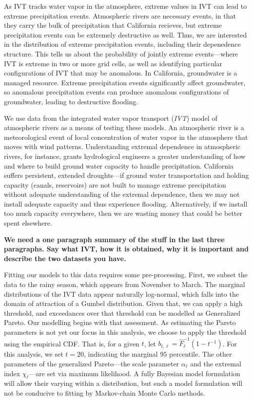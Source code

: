 As IVT tracks water vapor in the atmosphere, extreme values in IVT can lead to
  extreme precipitation events.  Atmospheric rivers are necessary events, in that they carry the
  bulk of precipitation that California recieves, but extreme precipitation events can be extremely
  destructive as well.  Thus, we are interested in the distribution of extreme precipitation events,
  including their depenedence structure.  This tells us about the probability of jointly extreme
  events---where IVT is extreme in two or more grid cells, as well as identifying particular
  configurations of IVT that may be anomalous.  In California, groundwater is a managed resource.
  Extreme precipitation events significantly affect groundwater, so anomalous precipitation events
  can produce anomalous configurations of groundwater, leading to destructive flooding.

We use data from the integrated water vapor transport (\emph{IVT}) model \citep{guan2015}
  of atmospheric rivers as a means of testing these models.  An atmospheric river is a meteorological
  event of local concentration of water vapor in the atmosphere that moves with wind patterns.
  Understanding extremal dependence in atmospheric rivers, for instance, grants hydrological engineers
  a greater understanding of how and where to build ground water capacity to handle precipitation.
  California suffers persistent, extended droughts---if ground water transportation and holding capacity
  (canals, reservoirs) are not built to manage extreme precipitation without adequate understanding of
  the extremal dependence, then we may not install adequate capacity and thus experience flooding.
  Alternatively, if we install too much capacity everywhere, then we are wasting money that could be
  better spent elsewhere.
  
  {\bf We need a one paragraph summary of the stuff in the last three paragraphs. Say what IVT, how it is obtained, why it is important and describe the two datasets you have.}

Fitting our models to this data requires some pre-processing. First, we subset the data to the rainy
  season, which appears from November to March.  The marginal distributions of the
  IVT data appear naturally log-normal, which falls into the domain of attraction of a Gumbel
  distribution.  Given that, we can apply a high threshold, and exceedances over that threshold can
  be modelled as Generalized Pareto.  Our modelling begins with that assessment.  As estimating
  the Pareto parameters is not yet our focus in this analysis, we choose to apply the threshold
  using the empirical CDF.  That is, for a given $t$, let $b_{t,\ell} = \hat{F}_{\ell}^{-1}(1 - t^{-1})$.  For
  this analysis, we set $t = 20$, indicating the marginal $95$ percentile.  The other parameters of the
  generalized Pareto---the scale parameter $\alpha_{\ell}$ and the extremal index $\chi_{\ell}$---are set via
  maximum likelihood.  A fully Bayesian model formulation will allow their varying within a
  distribution, but such a model formulation will not be conducive to fitting by Markov-chain Monte
  Carlo methods.

